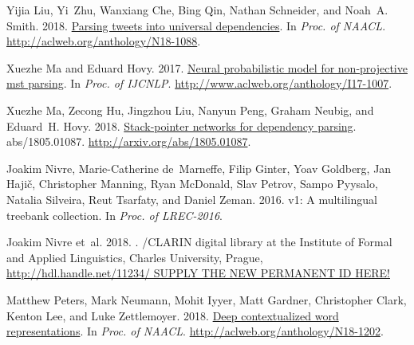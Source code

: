 \documentclass[11pt,a4paper]{article}
\begin{document}
\begin{thebibliography}{}
	Yijia Liu, Yi~Zhu, Wanxiang Che, Bing Qin, Nathan Schneider, and Noah~A. Smith.
	2018{}.
	\newblock \href{http://aclweb.org/anthology/N18-1088}{Parsing tweets into
		universal dependencies}.
	\newblock In {\em Proc. of NAACL\/}.
	\newblock
	\href{http://aclweb.org/anthology/N18-1088}{http://aclweb.org/anthology/N18-1088}.
	
	Xuezhe Ma and Eduard Hovy. 2017.
	\newblock \href{http://www.aclweb.org/anthology/I17-1007}{Neural probabilistic
		model for non-projective mst parsing}.
	\newblock In {\em Proc. of IJCNLP\/}.
	\newblock
	\href{http://www.aclweb.org/anthology/I17-1007}{http://www.aclweb.org/anthology/I17-1007}.
	
	Xuezhe Ma, Zecong Hu, Jingzhou Liu, Nanyun Peng, Graham Neubig, and Eduard~H.
	Hovy. 2018.
	\newblock \href{http://arxiv.org/abs/1805.01087}{Stack-pointer networks for
		dependency parsing}.
	 abs/1805.01087.
	\newblock
	\href{http://arxiv.org/abs/1805.01087}{http://arxiv.org/abs/1805.01087}.
	
	Joakim Nivre, Marie-Catherine de~Marneffe, Filip Ginter, Yoav Goldberg, Jan
	Haji{\v{c}}, Christopher Manning, Ryan McDonald, Slav Petrov, Sampo Pyysalo,
	Natalia Silveira, Reut Tsarfaty, and Daniel Zeman. 2016.
	 v1: A multilingual treebank collection.
	\newblock In {\em Proc. of LREC-2016\/}.
	
	Joakim Nivre et~al. 2018.
	.
	/{CLARIN} digital library at the Institute of Formal and
	Applied Linguistics, Charles University, Prague,
	\url{http://hdl.handle.net/11234/ SUPPLY THE NEW PERMANENT ID HERE!}
	
	Matthew Peters, Mark Neumann, Mohit Iyyer, Matt Gardner, Christopher Clark,
	Kenton Lee, and Luke Zettlemoyer. 2018.
	\newblock \href{http://aclweb.org/anthology/N18-1202}{Deep contextualized word
		representations}.
	\newblock In {\em Proc. of NAACL\/}.
	\newblock
	\href{http://aclweb.org/anthology/N18-1202}{http://aclweb.org/anthology/N18-1202}.
	

\end{thebibliography}
\end{document}
